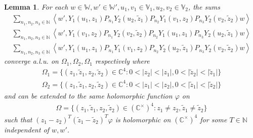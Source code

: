 \documentclass[11pt,b5paper,notitlepage]{article}
\theoremstyle{definition}
\theoremstyle{plain}
\newtheorem{lm}[df]{Lemma}
\newcommand{\wtd}{\widetilde}
\newcommand{\Vbb}{\mathbb V}
\newcommand{\Wbb}{\mathbb W}
\newcommand{\Cbb}{\mathbb C}
\newcommand{\Nbb}{\mathbb N}
\newcommand{\<}{\left\langle}
\renewcommand{\>}{\right\rangle}
\numberwithin{equation}{subsection}
\begin{document}
\begin{lm}\label{lb29}
         For each $w\in \Wbb,w'\in \Wbb',u_1,v_1\in \Vbb_1,u_2,v_2\in \Vbb_2$, the sums
\begin{subequations}
\begin{gather}
\sum_{n_1,n_2,n_3\in\Nbb} \<w',Y_1(u_1,z_1)P_{n_1}Y_2(u_2, \wtd z_1)P_{n_2}Y_1(v_1,z_2)P_{n_3}Y_2(v_2,\wtd z_2)w\>  \label{locality1}\\
\sum_{n_1,n_2,n_3\in\Nbb} \<w',Y_1(v_1,z_2)P_{n_1}Y_2(v_2, \wtd z_2)P_{n_2}Y_1(u_1,z_1)P_{n_3}Y_2(u_2,\wtd z_1)w\>  \label{locality2}\\
\sum_{n_1,n_2,n_3\in\Nbb} \<w',Y_1(u_1,z_1)P_{n_1}Y_1(v_1,z_2)P_{n_2}Y_2(u_2, \wtd z_1)P_{n_3}Y_2(v_2,\wtd z_2)w\>  \label{eq104}
\end{gather}
\end{subequations}
converge a.l.u. on $\Omega_1,\Omega_2,\Omega_1$ respectively where
\begin{subequations}
\begin{gather}
\Omega_1=\{(z_1,\wtd z_1,z_2,\wtd z_2)\in \Cbb^4:0<\vert z_2\vert <\vert z_1\vert,0<\vert \wtd z_2\vert <\vert \wtd z_1\vert\}\\
\Omega_2=\{(z_1,\wtd z_1,z_2,\wtd z_2)\in \Cbb^4:0<\vert z_1\vert <\vert z_2\vert,0<\vert \wtd z_1\vert <\vert \wtd z_2\vert\}
\end{gather}
\end{subequations}
and can be extended to the same holomorphic function $\varphi$ on 
\begin{gather}
\Omega=\{(z_1,\wtd z_1,z_2,\wtd z_2)\in (\Cbb^\times)^4:z_1\ne z_2,\wtd z_1\ne \wtd z_2\}  \label{eq91}
\end{gather}
such that $(z_1-z_2)^T (\wtd z_1-\wtd z_2)^T \varphi$ is holomorphic on $(\Cbb^\times)^4$ for some $T\in \Nbb$ independent of $w,w'$.
\end{lm}
\end{document}
